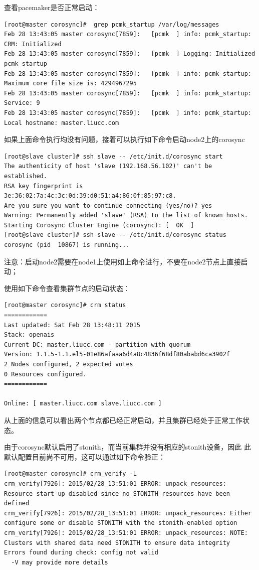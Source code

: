 查看pacemaker是否正常启动：
\begin{verbatim}
[root@master corosync]#  grep pcmk_startup /var/log/messages
Feb 28 13:43:05 master corosync[7859]:   [pcmk  ] info: pcmk_startup: CRM: Initialized
Feb 28 13:43:05 master corosync[7859]:   [pcmk  ] Logging: Initialized pcmk_startup
Feb 28 13:43:05 master corosync[7859]:   [pcmk  ] info: pcmk_startup: Maximum core file size is: 4294967295
Feb 28 13:43:05 master corosync[7859]:   [pcmk  ] info: pcmk_startup: Service: 9
Feb 28 13:43:05 master corosync[7859]:   [pcmk  ] info: pcmk_startup: Local hostname: master.liucc.com
\end{verbatim}

如果上面命令执行均没有问题，接着可以执行如下命令启动node2上的corosync
\begin{verbatim}
[root@slave cluster]# ssh slave -- /etc/init.d/corosync start
The authenticity of host 'slave (192.168.56.102)' can't be established.
RSA key fingerprint is 3e:36:02:7a:4c:3c:0d:39:d0:51:a4:86:0f:85:97:c8.
Are you sure you want to continue connecting (yes/no)? yes
Warning: Permanently added 'slave' (RSA) to the list of known hosts.
Starting Corosync Cluster Engine (corosync): [  OK  ]
[root@slave cluster]# ssh slave -- /etc/init.d/corosync status
corosync (pid  10867) is running...
\end{verbatim}

注意：启动node2需要在node1上使用如上命令进行，不要在node2节点上直接启动；

使用如下命令查看集群节点的启动状态：
\begin{verbatim}
[root@master corosync]# crm status
============
Last updated: Sat Feb 28 13:48:11 2015
Stack: openais
Current DC: master.liucc.com - partition with quorum
Version: 1.1.5-1.1.el5-01e86afaaa6d4a8c4836f68df80ababd6ca3902f
2 Nodes configured, 2 expected votes
0 Resources configured.
============

Online: [ master.liucc.com slave.liucc.com ]

\end{verbatim}

从上面的信息可以看出两个节点都已经正常启动，并且集群已经处于正常工作状
态。

由于corosync默认启用了stonith，而当前集群并没有相应的stonith设备，因此
此默认配置目前尚不可用，这可以通过如下命令验正：

\begin{verbatim}
[root@master corosync]# crm_verify -L
crm_verify[7926]: 2015/02/28_13:51:01 ERROR: unpack_resources: Resource start-up disabled since no STONITH resources have been defined
crm_verify[7926]: 2015/02/28_13:51:01 ERROR: unpack_resources: Either configure some or disable STONITH with the stonith-enabled option
crm_verify[7926]: 2015/02/28_13:51:01 ERROR: unpack_resources: NOTE: Clusters with shared data need STONITH to ensure data integrity
Errors found during check: config not valid
  -V may provide more details

\end{verbatim}

